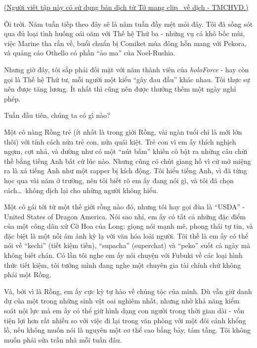 \documentclass[../main.tex]{subfiles}
\begin{document}
\begin{center}
  \uline{(Người viết tập này có sử dụng bản dịch từ \href{https://www.youtube.com/@TomangclipHololivevedich}{Tớ mang clip \hll\ về dịch - TMCHVD}.)}
\end{center}


Ôi trời. Năm tuần tiếp theo đây sẽ là năm tuần đầy mệt mỏi đây. Tôi đã sống sót qua đủ loại tình huống oái oăm với Thế hệ Thứ ba - những vụ cá khô bốc mùi, việc Marine tha rắn về, buổi chuẩn bị Comiket mùa đông hỗn mang với Pekora, và quảng cáo Othello có phần ``ảo ma'' của Noel-Rushia.

Nhưng giờ đây, tôi sắp phải đối mặt với năm thành viên của \textit{holoForce} - hay còn gọi là Thế hệ Thứ tư, mỗi người một kiểu ``gây đau đầu'' khác nhau. Tôi thực sự nên được tăng lương. Ít nhất thì cũng nên được thưởng thêm một ngày nghỉ phép.

Tuần đầu tiên, chúng ta có gì nào?

Một cô nàng Rồng trẻ (ít nhất là trong giới Rồng, vài ngàn tuổi chỉ là mới lớn thôi) với tính cách nửa trẻ con, nửa quái kiệt. Trẻ con vì em ấy thích nghịch ngợm, cợt nhả, và dường như có một ``nút bấm'' khiến cô bật ra những câu chửi thề bằng tiếng Anh bất cứ lúc nào. Nhưng cũng có chút giang hồ vì cứ mở miệng ra là xả tiếng Anh như một rapper bị kích động. Tôi hiểu tiếng Anh, vì đã từng học qua vài năm ở trường, nên tôi biết rõ em ấy đang nói gì, và tôi đã chọn cách\dots\ không dịch lại cho những người không hiểu.

Một cô gái tới từ một thế giới rồng nào đó, nhưng tôi hay gọi đùa là ``USDA'' - United States of Dragon America. Nói sao nhỉ, em ấy có tất cả những đặc điểm của một công dân xứ Cờ Hoa của Long: giọng nói mạnh mẽ, phong thái tự tin, và đặc biệt là một nỗi ám ảnh kỳ lạ với văn hóa loài người. Tôi thề là em ấy có thể nói về ``kechi'' (tiết kiệm tiền), ``supacha'' (superchat) và ``peko'' suốt cả ngày mà không biết chán. Có lần tôi nghe em ấy nói chuyện với Fubuki về các loại hình thức tiết kiệm, tôi tưởng mình đang nghe một chuyên gia tài chính chứ không phải một Rồng.

Và, bởi vì là Rồng, em ấy cực kỳ tự hào về chủng tộc của mình. Dù vẫn giữ danh dự của một trong những sinh vật oai nghiêm nhất, nhưng nhờ khả năng kiểm soát nội lực mà em ấy có thể giữ hình dạng con người trong thời gian dài - vốn tiện lợi hơn rất nhiều so với việc đi lại trong văn phòng với một đôi cánh khổng lồ, nếu không muốn nói là nguyên một cơ thể cao bằng bảy, tám tầng. Tôi không muốn phải sửa trần nhà mỗi tuần đâu.
\end{document}
